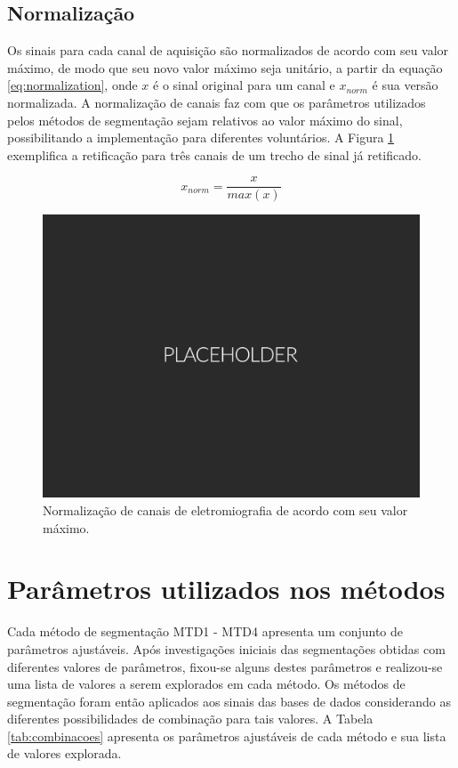 \subsection{Normalização}

Os sinais para cada canal de aquisição são normalizados de acordo com seu valor máximo, de modo que seu novo valor máximo seja unitário, a partir da equação \ref{eq:normalization}, onde $x$ é o sinal original para um canal e $x_{norm}$ é sua versão normalizada. A normalização de canais faz com que os parâmetros utilizados pelos métodos de segmentação sejam relativos ao valor máximo do sinal, possibilitando a implementação para diferentes voluntários. A Figura \ref{fig:normalization} exemplifica a retificação para três canais de um trecho de sinal já retificado.

\begin{equation}
	\label{eq:x_normalization}
	x_{norm} = \frac{x}{max(x)}
\end{equation}

\begin{figure}[!htb]
	\label{fig:normalization}
	\caption{Normalização de canais de eletromiografia de acordo com seu valor máximo.}
	\begin{center}
	    \includegraphics[width=0.75\linewidth]{./img/placeholder.png}
	\end{center}
\end{figure}

\section{Parâmetros utilizados nos métodos}

Cada método de segmentação MTD1 - MTD4 apresenta um conjunto de parâmetros ajustáveis. Após investigações iniciais das segmentações obtidas com diferentes valores de parâmetros, fixou-se alguns destes parâmetros e realizou-se uma lista de valores a serem explorados em cada método. Os métodos de segmentação foram então aplicados aos sinais das bases de dados considerando as diferentes possibilidades de combinação para tais valores. A Tabela \ref{tab:combinacoes} apresenta os parâmetros ajustáveis de cada método e sua lista de valores explorada.

